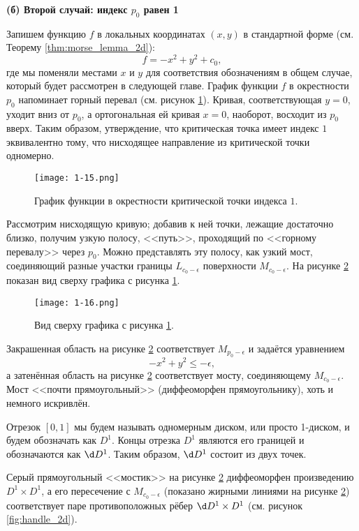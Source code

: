 \documentclass[a4paper,12pt,openany,leqno]{extbook}
\begin{document}
\textbf{(б) Второй случай: индекс $p_0$ равен 1}

Запишем функцию $f$ в локальных координатах $(x, y)$ в стандартной форме (см. Теорему \ref{thm:morse_lemma_2d}):
\begin{equation}
f = -x^2 + y^2 + c_0,
\end{equation}
где мы поменяли местами $x$ и $y$ для соответствия обозначениям в общем случае, который будет рассмотрен в следующей главе. График функции $f$ в окрестности $p_0$ напоминает горный перевал (см. рисунок \ref{fig:p0_index_one}). Кривая, соответствующая $y = 0$, уходит вниз от $p_0$, а ортогональная ей кривая $x = 0$, наоборот, восходит из $p_0$ вверх. Таким образом, утверждение, что критическая точка имеет индекс $1$ эквивалентно тому, что нисходящее направление из критической точки одномерно.

\begin{figure}[ht]
\texttt{[image: 1-15.png]}
\caption{График функции в окрестности критической точки индекса $1$.}
\label{fig:p0_index_one}
\end{figure}

Рассмотрим нисходящую кривую; добавив к ней точки, лежащие достаточно близко, получим узкую полосу, <<путь>>, проходящий по <<горному перевалу>> через $p_0$. Можно представлять эту полосу, как узкий мост, соединяющий разные участки границы $L_{c_0 - \epsilon}$ поверхности $M_{c_0 - \epsilon}$. На рисунке \ref{fig:p0_index_one_top_view} показан вид сверху графика с рисунка \ref{fig:p0_index_one}.

\begin{figure}[ht]
\texttt{[image: 1-16.png]}
\caption{Вид сверху графика с рисунка \ref{fig:p0_index_one}.}
\label{fig:p0_index_one_top_view}
\end{figure}

Закрашенная область на рисунке \ref{fig:p0_index_one_top_view} соответствует $M_{p_0 - \epsilon}$ и задаётся уравнением
\[
-x^2 + y^2 \leq - \epsilon,
\]
а затенённая область на рисунке \ref{fig:p0_index_one_top_view} соответствует мосту, соединяющему $M_{c_0 - \epsilon}$. Мост <<почти прямоугольный>> (диффеоморфен прямоугольнику), хоть и немного искривлён.

Отрезок $[0, 1]$ мы будем называть одномерным диском, или просто 1-диском, и будем обозначать как $D^1$. Концы отрезка $D^1$ являются его границей и обозначаются как $\d D^1$. Таким образом, $\d D^1$ состоит из двух точек.

Серый прямоугольный <<мостик>> на рисунке \ref{fig:p0_index_one_top_view} диффеоморфен произведению $D^1 \times D^1$, а его пересечение с $M_{c_0 - \epsilon}$ (показано жирными линиями на рисунке \ref{fig:p0_index_one_top_view}) соответствует паре противоположных рёбер $\d D^1 \times D^1$ (см. рисунок \ref{fig:handle_2d}).
\end{document}
